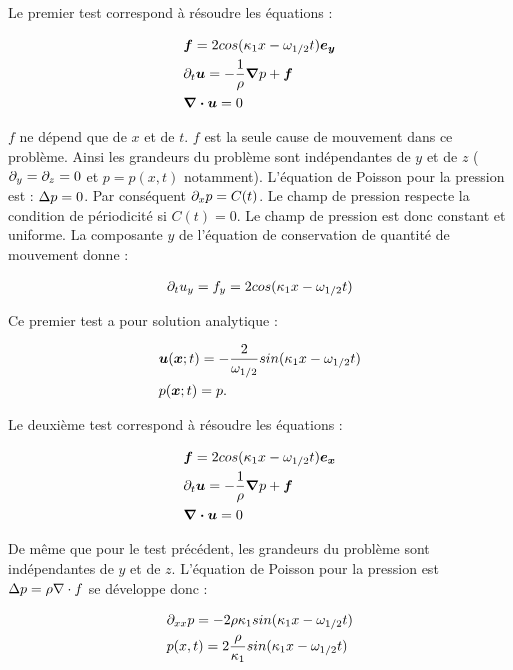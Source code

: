 Le premier test correspond à résoudre les équations : 

\begin{align*}
&\bm{f} = 2 cos(\k_1 x - \o_{1/2} t) \bm{e_y} \\
&\p_t \bm{u} = - \frac{1}{\r} \bm{\nabla} p + \bm{f} \\                
&\bm{ \nabla \cdot u } = 0 \\
\end{align*}

$f$ ne dépend que de $x$ et de $t$. $f$ est la seule cause de mouvement dans ce problème. Ainsi les grandeurs du problème sont indépendantes de $y$ et de $z$ ($\p_y = \p_z = 0$ et $p=p(x,t)$ notamment). L'équation de Poisson pour la pression est : $\D p = 0$. Par conséquent $\p_x p  = C(t)$. Le champ de pression respecte la condition de périodicité si $C(t) = 0$. Le champ de pression est donc constant et uniforme.
La composante $y$ de l'équation de conservation de quantité de mouvement donne : 

\begin{align*}
&\p_t u_y = f_y = 2 cos(\k_1 x - \o_{1/2} t)\\ 
\end{align*}

Ce premier test a pour solution analytique :
\begin{mdframed}
\begin{align*} 
&\bm{u}(\bm{x};t) = - \frac{2}{\o_{1/2}} sin(\k_1 x - \o_{1/2} t)  \\
&p(\bm{x};t)=p.   
\end{align*}
\end{mdframed}

Le deuxième test correspond à résoudre les équations : 

\begin{align*}
&\bm{f} = 2 cos(\k_1 x - \o_{1/2} t) \bm{e_x} \\
&\p_t \bm{u} = - \frac{1}{\r} \bm{\nabla} p + \bm{f} \\                
&\bm{ \nabla \cdot u } = 0 \\
\end{align*}

De même que pour le test précédent, les grandeurs du problème sont indépendantes de $y$ et de $z$. L’équation de Poisson pour la pression est $\D p = \r \na \cdot f$ se développe donc :  

\begin{align*}
&\p_{xx} p= - 2 \r \k_1 sin(\k_1 x - \o_{1/2} t) \\
&p(x,t) = 2 \frac{\r}{\k_1} sin(\k_1 x - \o_{1/2} t)
\end{align*}

